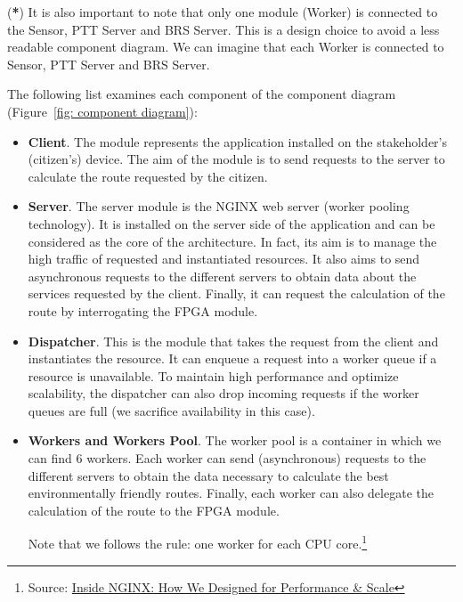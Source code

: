 \documentclass[a4paper]{article}
\newcommand{\highspace}{\vspace{1.2em}\noindent}
\begin{document}
    \highspace
    (\textcolor{Red3}{\textbf{*}}) It is also important to note that only one module (Worker) is connected to the Sensor, PTT Server and BRS Server. This is a design choice to avoid a less readable component diagram. We can imagine that each Worker is connected to Sensor, PTT Server and BRS Server.

    \highspace
    The following list examines each component of the component diagram (Figure~\ref{fig: component diagram}):
    \begin{itemize}
        \item \textbf{Client}. The module represents the application installed on the stakeholder's (citizen's) device. The aim of the module is to send requests to the server to calculate the route requested by the citizen.

        \item \textbf{Server}. The server module is the NGINX web server (worker pooling technology). It is installed on the server side of the application and can be considered as the core of the architecture. In fact, its aim is to manage the high traffic of requested and instantiated resources. It also aims to send asynchronous requests to the different servers to obtain data about the services requested by the client. Finally, it can request the calculation of the route by interrogating the FPGA module.

        \item \textbf{Dispatcher}. This is the module that takes the request from the client and instantiates the resource. It can enqueue a request into a worker queue if a resource is unavailable. To maintain high performance and optimize scalability, the dispatcher can also drop incoming requests if the worker queues are full (we sacrifice availability in this case). 

        \item \textbf{Workers and Workers Pool}. The worker pool is a container in which we can find 6 workers. Each worker can send (asynchronous) requests to the different servers to obtain the data necessary to calculate the best environmentally friendly routes. Finally, each worker can also delegate the calculation of the route to the FPGA module.
        
        Note that we follows the rule: one worker for each CPU core.\footnote{Source: \href{https://www.nginx.com/blog/inside-nginx-how-we-designed-for-performance-scale/}{Inside NGINX: How We Designed for Performance \& Scale}}


\end{itemize}
\end{document}
